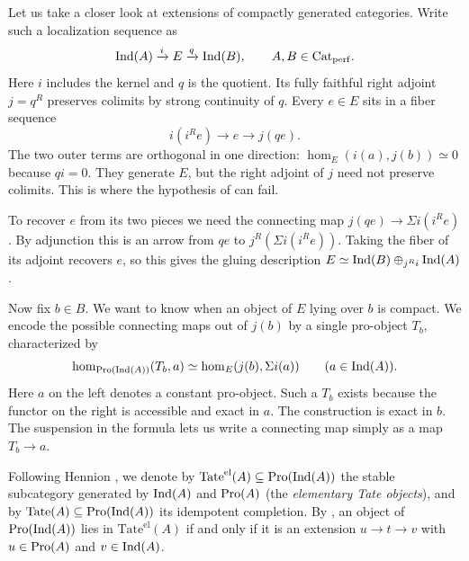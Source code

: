 	Let us take a closer look at extensions of compactly generated categories. Write such a localization sequence as
	\[
		\operatorname{Ind}(A) \xrightarrow{i} E \xrightarrow{q} \operatorname{Ind}(B), \qquad A,B\in{\textup{Cat}}_{\operatorname{perf}}.
	\]
	Here $i$ includes the kernel and $q$ is the quotient. Its fully faithful right adjoint $j=q^R$ preserves colimits by strong continuity of $q$. Every $e\in E$ sits in a fiber sequence
	\[
		i(i^R e)\longrightarrow e\longrightarrow j(qe).
	\]
	The two outer terms are orthogonal in one direction: $\hom_E(i(a),j(b))\simeq 0$ because $qi=0$. They generate $E$, but the right adjoint of $j$ need not preserve colimits. This is where the hypothesis of  can fail.

	To recover $e$ from its two pieces we need the connecting map $j(qe)\to\Sigma i(i^Re)$. By adjunction this is an arrow from $qe$ to $j^R(\Sigma i(i^Re))$. Taking the fiber of its adjoint recovers $e$, so this gives the gluing description $E\simeq\operatorname{Ind}(B)\oplus_{j^R i}\operatorname{Ind}(A)$.

	Now fix $b\in B$. We want to know when an object of $E$ lying over $b$ is compact. We encode the possible connecting maps out of $j(b)$ by a single pro-object $T_b$, characterized by
	\[
		\hom_{\operatorname{Pro}(\operatorname{Ind}(A))}(T_b,a)\simeq\hom_E(j(b),\Sigma i(a))
		\qquad (a\in\operatorname{Ind}(A)).
	\]
	Here $a$ on the left denotes a constant pro-object. Such a $T_b$ exists because the functor on the right is accessible and exact in $a$. The construction is exact in $b$. The suspension in the formula lets us write a connecting map simply as a map $T_b\to a$.

	Following Hennion \cite{Hennion_Tate}, we denote by $\mathrm{Tate}^{\mathrm{el}}(A) \subseteq \operatorname{Pro}(\operatorname{Ind}(A))$ the stable subcategory generated by $\operatorname{Ind}(A)$ and $\operatorname{Pro}(A)$ (the \emph{elementary Tate objects}), and by $\mathrm{Tate}(A) \subseteq \operatorname{Pro}(\operatorname{Ind}(A))$ its idempotent completion. By \cite[Theorem~3]{Hennion_Tate}, an object of $\operatorname{Pro}(\operatorname{Ind}(A))$ lies in $\mathrm{Tate}^{\mathrm{el}}(A)$ if and only if it is an extension $u \to t \to v$ with $u \in \operatorname{Pro}(A)$ and $v \in \operatorname{Ind}(A)$.


